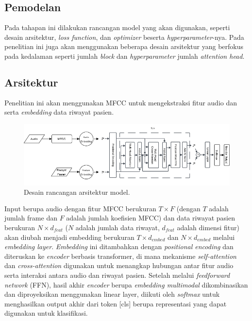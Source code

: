     \subsection{Pemodelan}
    Pada tahapan ini dilakukan rancangan model yang akan digunakan, seperti desain arsitektur, \textit{loss function}, dan \textit{optimizer} beserta \textit{hyperparameter}-nya. Pada penelitian ini juga akan menggunakan beberapa desain arsitektur yang berfokus pada kedalaman seperti jumlah \textit{block} dan \textit{hyperparameter} jumlah \textit{attention head}.

    \subsection{Arsitektur}
    Penelitian ini akan menggunakan MFCC untuk mengekstraksi fitur audio dan serta \textit{embedding} data riwayat pasien.
    \begin{figure}[H]
        \centering
        \includegraphics[width=1\linewidth]{gambar/Arsitektur Model.png}
        \caption{Desain rancangan arsitektur model.}
        \label{fig:model}
    \end{figure}
    Input berupa audio dengan fitur MFCC berukuran \(T \times F\) (dengan \(T\) adalah jumlah frame dan \(F\) adalah jumlah koefisien MFCC) dan data riwayat pasien berukuran \(N \times d_{feat}\) (\(N\) adalah jumlah data riwayat, \(d_{feat}\) adalah dimensi fitur) akan diubah menjadi embedding berukuran \(T \times d_{embed}\) dan \(N \times d_{embed}\) melalui \textit{embedding layer}. \textit{Embedding} ini ditambahkan dengan \textit{positional encoding} dan diteruskan ke \textit{encoder} berbasis transformer, di mana mekanisme \textit{self-attention} dan \textit{cross-attention} digunakan untuk menangkap hubungan antar fitur audio serta interaksi antara audio dan riwayat pasien. Setelah melalui \textit{feedforward network} (FFN), hasil akhir \textit{encoder} berupa \textit{embedding multimodal} dikombinasikan dan diproyeksikan menggunakan linear layer, diikuti oleh \textit{softmax} untuk menghasilkan output akhir dari token [cls] berupa representasi yang dapat digunakan untuk klasifikasi.

